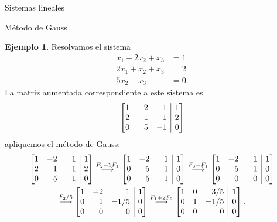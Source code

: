 \documentclass[a4paper,12pt,twoside,spanish,reqno]{amsbook}
\theoremstyle{definition}
\newtheorem{ejemplo}{Ejemplo}[section]
\theoremstyle{remark}
\begin{document}
\begin{chapter}{Sistemas lineales}
\begin{section}{Método de Gauss }
                \begin{ejemplo} Resolvamos el sistema
                    \begin{align*}
                    x_1 -2x_2 + x_3  &= 1\\
                    2x_1 +x_2 + x_3  &= 2\\
                    5x_2 - x_3  &= 0.
                    \end{align*}
                    La matriz  aumentada correspondiente a este sistema es
                    \begin{equation*}
                     \left[\begin{array}{@{}*{3}{r}|r@{}} 
                     1 & -2 & 1 &  1 \\ 2 & 1 & 1 &  2 \\ 0 & 5 & -1 &  0 
                    \end{array}\right]
                    \end{equation*}
                    apliquemos el método de Gauss:
                    \begin{multline*}
                    \left[\begin{array}{@{}*{3}{r}|r@{}}1 & -2 & 1 &  1 \\ 2 & 1 & 1 &  2 \\	0 & 5 & -1 &  0  \end{array}\right]
                    \stackrel{F_2 - 2F_1}{\longrightarrow} 
                    \left[\begin{array}{@{}*{3}{r}|r@{}}1 & -2 & 1 &  1 \\ 0 & 5 & -1 &  0 \\	0 & 5 & -1 &  0  \end{array}\right]
                    \stackrel{F_3-F_1}{\longrightarrow} 
                    \left[\begin{array}{@{}*{3}{r}|r@{}}1 & -2 & 1 &  1 \\ 0 & 5 & -1 &  0 \\	0 & 0 & 0 & 0  \end{array}\right]
                    \\
                    \stackrel{F_2/5}{\longrightarrow} 
                    \left[\begin{array}{@{}*{3}{r}|r@{}}1 & -2 & 1 &  1 \\ 0 & 1 & -1/5 &  0 \\	0 & 0 & 0 &  0  \end{array}\right]
                    \stackrel{F_1+2 F_2}{\longrightarrow} 
                    \left[\begin{array}{@{}*{3}{r}|r@{}}1 & 0 & 3/5 & 1 \\ 0 & 1 & -1/5 &  0 \\	0 & 0 & 0 &  0  \end{array}\right].

\end{multline*}
\end{ejemplo}
\end{section}
\end{chapter}
\end{document}
